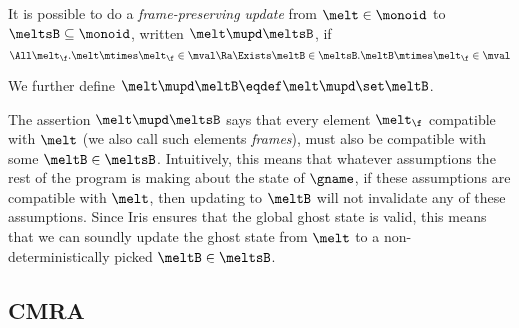 \begin{defn}
  It is possible to do a \emph{frame-preserving update} from $\melt \in \monoid$ to $\meltsB \subseteq \monoid$, written $\melt \mupd \meltsB$, if
  \[ \All \melt_\f. \melt \mtimes \melt_\f \in \mval \Ra \Exists \meltB \in \meltsB. \meltB \mtimes \melt_\f \in \mval \]

  We further define $\melt \mupd \meltB \eqdef \melt \mupd \set\meltB$.
\end{defn}
The assertion $\melt \mupd \meltsB$ says that every element $\melt_\f$ compatible with $\melt$ (we also call such elements \emph{frames}), must also be compatible with some $\meltB \in \meltsB$.
Intuitively, this means that whatever assumptions the rest of the program is making about the state of $\gname$, if these assumptions are compatible with $\melt$, then updating to $\meltB$ will not invalidate any of these assumptions.
Since Iris ensures that the global ghost state is valid, this means that we can soundly update the ghost state from $\melt$ to a non-deterministically picked $\meltB \in \meltsB$.

\subsection{CMRA}

